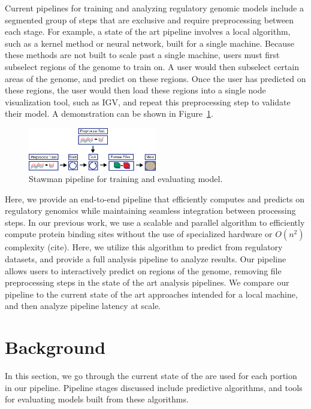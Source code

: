\documentclass{sig-alternate-05-2015}
\begin{document}
Current pipelines for training and analyzing regulatory genomic models include a segmented group of steps that are exclusive and require preprocessing between each stage. For example, a state of the art pipeline involves a local algorithm, such as a kernel method or neural network, built for a single machine. Because these methods are not built to scale past a single machine, users must first subselect regions of the genome to train on. A user would then subselect certain areas of the genome, and predict on these regions. Once the user has predicted on these regions, the user would then load these regions into a single node visualization tool, such as IGV, and repeat this preprocessing step to validate their model. A demonstration can be shown in Figure~\ref{fig:strawmanPipeline}. \\

\begin{figure}
  \label{fig:strawmanPipeline}
  \includegraphics[width=0.5\textwidth]{figures/strawman.png}
  \caption{Stawman pipeline for training and evaluating model.}
\end{figure}

Here, we provide an end-to-end pipeline that efficiently computes and predicts on regulatory genomics while maintaining seamless integration between processing steps. In our previous work, we use a scalable and parallel algorithm to efficiently compute protein binding sites without the use of specialized hardware or $O(n^2)$ complexity (cite). Here, we utilize this algorithm to predict from regulatory datasets, and provide a full analysis pipeline to analyze results. Our pipeline allows users to interactively predict on regions of the genome, removing file preprocessing steps in the state of the art analysis pipelines. We compare our pipeline to the current state of the art approaches intended for a local machine, and then analyze pipeline latency at scale.

\section{Background}
In this section, we go through the current state of the are used for each portion in our pipeline. Pipeline stages discussed include predictive algorithms, and tools for evaluating models built from these algorithms.
\end{document}
